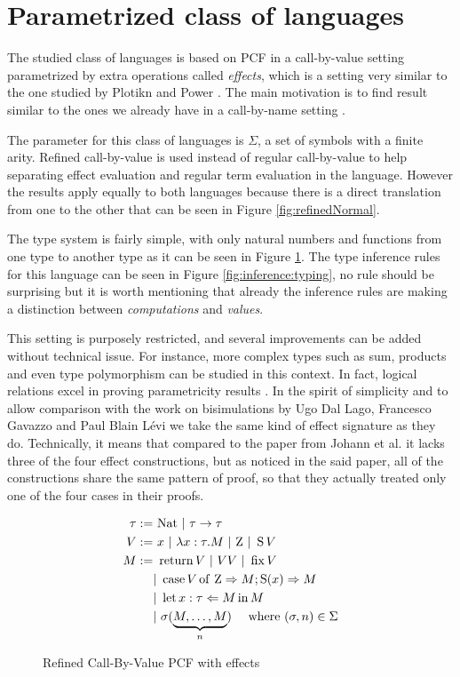 \section{Parametrized class of languages}

The studied class of languages is based on PCF \cite{plotkin1977lcf} in a call-by-value setting 
parametrized by extra operations called \emph{effects}, which is a setting very similar to 
the one studied by Plotikn and Power \cite{plotkin2001adequacy}. 
The main motivation is to find result similar to the ones 
we already have in a call-by-name setting \cite{gom}.

The parameter for this class of languages is $\Sigma$,  
a set of symbols with a finite arity.
Refined call-by-value \cite{Ugo2017} is used instead of regular call-by-value 
to help separating effect evaluation and regular term 
evaluation in the language. However the results apply equally to both 
languages because there is a direct translation from one to
the other that can be seen in Figure \ref{fig:refinedNormal}.

The type system is fairly simple, with only 
natural numbers and functions from one 
type to another type as it can be seen in Figure \ref{fig:language}.
The type inference rules for this language can be seen in Figure
\ref{fig:inference:typing}, no rule should be surprising
but it is worth mentioning that already the inference 
rules are making a distinction between \emph{computations}
and \emph{values}.

This setting is purposely restricted, and several improvements can 
be added without technical issue. For instance, more complex types 
such as sum, products and even type polymorphism can be studied 
in this context. In fact, logical relations excel in proving parametricity 
results \cite{wadler1989theorems}.
In the spirit of simplicity 
and to allow comparison with the work on bisimulations by
Ugo Dal Lago, Francesco Gavazzo and Paul Blain Lévi 
\cite{Ugo2017} we take the same kind of effect signature 
as they do. Technically, it means that compared to 
the paper from Johann et al. \cite{gom} it lacks 
three of the four effect constructions, but as noticed 
in the said paper, all of the constructions share the
same pattern of proof, so that they actually treated 
only one of the four cases in their proofs.


\begin{figure}[h!]
    \begin{align*}
        \tau :=& ~\Nat ~|~ \tau \to \tau \\
        V :=& ~x ~|~ \lambda x:\tau. M ~|~ \Zero ~|~ \Succ V \\
        M :=& ~\Ret V ~|~ V V ~|~ \Fix V \\
                    &|~ \lcase{V}{M}{M} \\
                    &|~ \Bind{M}{x:\tau}{M} \\
                    &|~ \sigma(\underbrace{M, \dots, M}_n ) \quad \text{ where } (\sigma,n)  \in \Sigma
    \end{align*}
    \caption{Refined Call-By-Value PCF with effects}
    \label{fig:language}
\end{figure}

